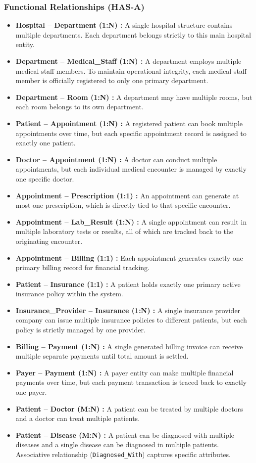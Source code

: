 \documentclass[12pt,a4paper]{article}
\begin{document}
\subsubsection*{Functional Relationships (HAS-A)}
\begin{itemize}[label=\textbf{--}]

	\item \textbf{Hospital -- Department (1:N) :} A single hospital structure contains multiple departments. Each department belongs strictly to this main hospital entity.
	\item \textbf{Department -- Medical\_Staff (1:N) :} A department employs multiple medical staff members. To maintain operational integrity, each medical staff member is officially registered to only one primary department.
	\item \textbf{Department -- Room (1:N) :} A department may have multiple rooms, but each room belongs to its own department.
	\item \textbf{Patient -- Appointment (1:N) :} A registered patient can book multiple appointments over time, but each specific appointment record is assigned to exactly one patient.
	\item \textbf{Doctor -- Appointment (1:N) :} A doctor can conduct multiple appointments, but each individual medical encounter is managed by exactly one specific doctor.
	\item \textbf{Appointment -- Prescription (1:1) :} An appointment can generate at most one prescription, which is directly tied to that specific encounter.
	\item \textbf{Appointment -- Lab\_Result (1:N) :} A single appointment can result in multiple laboratory tests or results, all of which are tracked back to the originating encounter.
	\item \textbf{Appointment -- Billing (1:1) :} Each appointment generates exactly one primary billing record for financial tracking.
	\item \textbf{Patient -- Insurance (1:1) :} A patient holds exactly one primary active insurance policy within the system.
	\item \textbf{Insurance\_Provider -- Insurance (1:N) :} A single insurance provider company can issue multiple insurance policies to different patients, but each policy is strictly managed by one provider.
	\item \textbf{Billing -- Payment (1:N) :} A single generated billing invoice can receive multiple separate payments until total amount is settled.
	\item \textbf{Payer -- Payment (1:N) :} A payer entity can make multiple financial payments over time, but each payment transaction is traced back to exactly one payer.
	\item \textbf{Patient -- Doctor (M:N) :} A patient can be treated by multiple doctors and a doctor can treat multiple patients.
	\item \textbf{Patient -- Disease (M:N) :} A patient can be diagnosed with multiple diseases and a single disease can be diagnosed in multiple patients. Associative relationship (\texttt{Diagnosed\_With}) captures specific attributes.
\end{itemize}
\vspace{0.3cm}
\end{document}
